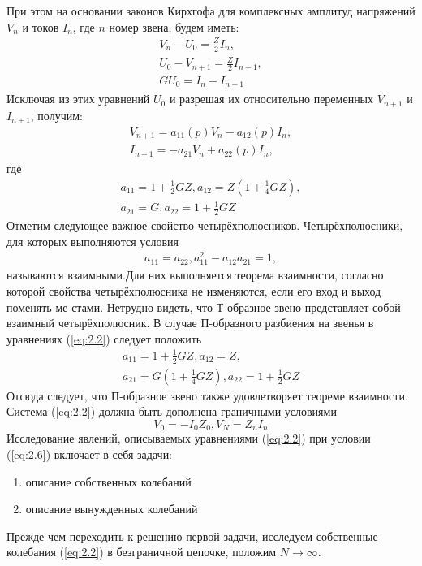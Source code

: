 При этом на основании законов Кирхгофа для комплексных амплитуд напряжений $V_n$ и токов $I_n$, где $n$ номер звена, будем иметь:
\begin{gather}
\label{eq:2.1}
V_n-U_0=\frac{Z}{2}I_n, \\
U_0-V_{n+1}=\frac{Z}{2}I_{n+1}, \\
GU_0=I_n-I_{n+1}
\end{gather}
Исключая из этих уравнений $U_0$ и разрешая их относительно переменных $V_{n+1}$ и $I_{n+1}$, получим:
\begin{gather}
\label{eq:2.2}
V_{n+1}=a_{11}(p)V_n-a_{12}(p)I_n, \\
I_{n+1}=-a_{21}V_n+a_{22}(p)I_n,
\end{gather}
где
\begin{gather}
\label{eq:2.3}
a_{11}=1+\frac{1}{2}GZ, a_{12}=Z(1+\frac{1}{4}GZ),\\
a_{21}=G, a_{22}=1+\frac{1}{2}GZ
\end{gather}
Отметим следующее важное свойство четырёхполюсников. Четырёхполюсники, для которых выполняются условия
\begin{gather}
\label{eq:2.4}
a_{11}= a_{22},a_{11}^2-a_{12}a_{21}=1,
\end{gather}
называются взаимными.Для них выполняется теорема взаимности, согласно которой свойства четырёхполюсника не изменяются, если его вход и выход поменять ме-стами. Нетрудно видеть, что Т-образное звено представляет собой взаимный четырёхполюсник. В случае П-образного разбиения на звенья в уравнениях (\ref{eq:2.2}) следует положить 
\begin{gather}
a_{11}=1+\frac{1}{2}GZ, a_{12}=Z,\\
a_{21}=G(1+\frac{1}{4}GZ), a_{22}=1+\frac{1}{2}GZ
\end{gather}
Отсюда следует, что П-образное звено также удовлетворяет теореме взаимности. 
Система (\ref{eq:2.2}) должна быть дополнена граничными условиями
\begin{equation}
	\label{eq:2.6}
	V_0=-I_0Z_0, V_N=Z_nI_n
\end{equation}
Исследование явлений, описываемых уравнениями (\ref{eq:2.2}) при условии (\ref{eq:2.6}) включает в себя задачи:
\begin{enumerate}
	\item описание собственных колебаний
	\item описание вынужденных колебаний
\end{enumerate}
Прежде чем переходить к решению первой задачи, исследуем собственные колебания (\ref{eq:2.2}) в безграничной цепочке, положим $N\rightarrow\infty$.


